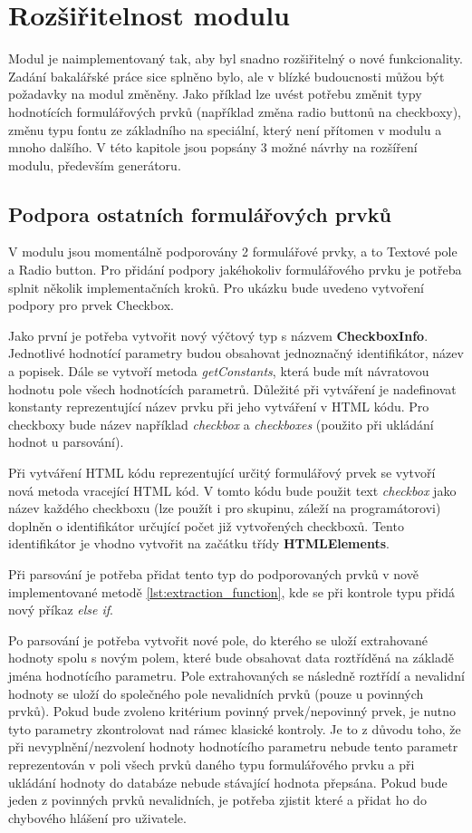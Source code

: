 \chapter{Rozšiřitelnost modulu}
Modul je naimplementovaný tak, aby byl snadno rozšiřitelný o nové funkcionality. Zadání bakalářské práce sice splněno bylo, ale v blízké budoucnosti můžou být požadavky na modul změněny. Jako příklad lze uvést potřebu změnit typy hodnotících formulářových prvků (například změna radio buttonů na checkboxy), změnu typu fontu ze základního na speciální, který není přítomen v modulu a mnoho dalšího. V této kapitole jsou popsány 3 možné návrhy na rozšíření modulu, především generátoru.

\section{Podpora ostatních formulářových prvků}
V modulu jsou momentálně podporovány 2 formulářové prvky, a to Textové pole a Radio button. Pro přidání podpory jakéhokoliv formulářového prvku je potřeba splnit několik implementačních kroků. Pro ukázku bude uvedeno vytvoření podpory pro prvek Checkbox.
\par
Jako první je potřeba vytvořit nový výčtový typ s názvem \textbf{CheckboxInfo}. Jednotlivé hodnotící parametry budou obsahovat jednoznačný identifikátor, název a popisek. Dále se vytvoří metoda \textit{getConstants}, která bude mít návratovou hodnotu pole všech hodnotících parametrů. Důležité při vytváření je nadefinovat konstanty reprezentující název prvku při jeho vytváření v HTML kódu. Pro checkboxy bude název například \textit{checkbox} a \textit{checkboxes} (použito při ukládání hodnot u parsování).
\par
Při vytváření HTML kódu reprezentující určitý formulářový prvek se vytvoří nová metoda vracející HTML kód. V tomto kódu bude použit text \textit{checkbox} jako název každého checkboxu (lze použít i pro skupinu, záleží na programátorovi) doplněn o identifikátor určující počet již vytvořených checkboxů. Tento identifikátor je vhodno vytvořit na začátku třídy \textbf{HTMLElements}.
\par
Při parsování je potřeba přidat tento typ do podporovaných prvků v nově implementované metodě \ref{lst:extraction_function}, kde se při kontrole typu přidá nový příkaz \textit{else if}.
\par
Po parsování je potřeba vytvořit nové pole, do kterého se uloží extrahované hodnoty spolu s novým polem, které bude obsahovat data roztříděná na základě jména hodnotícího parametru. Pole extrahovaných se následně roztřídí a nevalidní hodnoty se uloží do společného pole nevalidních prvků (pouze u povinných prvků). Pokud bude zvoleno kritérium povinný prvek/nepovinný prvek, je nutno tyto parametry zkontrolovat nad rámec klasické kontroly. Je to z důvodu toho, že při nevyplnění/nezvolení hodnoty hodnotícího parametru nebude tento parametr reprezentován v poli všech prvků daného typu formulářového prvku a při ukládání hodnoty do databáze nebude stávající hodnota přepsána. Pokud bude jeden z povinných prvků nevalidních, je potřeba zjistit které a přidat ho do chybového hlášení pro uživatele.
